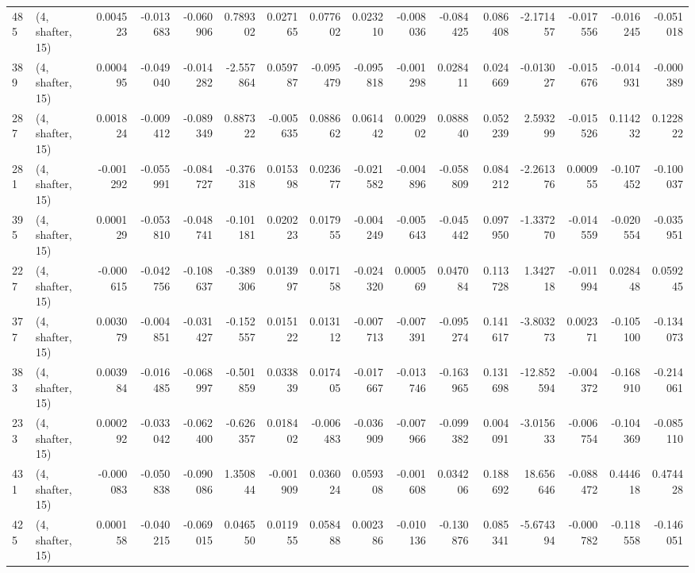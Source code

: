 \begin{tabular}{llrrrrrrrrrrrrrr}
485 &  (4, shafter, 15) &   0.004523 & -0.013683 & -0.060906 &    0.789302 &  0.027165 &   0.077602 &  0.023210 & -0.008036 & -0.084425 &  0.086408 &   -2.171457 & -0.017556 & -0.016245 & -0.051018 \\
389 &  (4, shafter, 15) &   0.000495 & -0.049040 & -0.014282 &   -2.557864 &  0.059787 &  -0.095479 & -0.095818 & -0.001298 &  0.028411 &  0.024669 &   -0.013027 & -0.015676 & -0.014931 & -0.000389 \\
287 &  (4, shafter, 15) &   0.001824 & -0.009412 & -0.089349 &    0.887322 & -0.005635 &   0.088662 &  0.061442 &  0.002902 &  0.088840 &  0.052239 &    2.593299 & -0.015526 &  0.114232 &  0.122822 \\
281 &  (4, shafter, 15) &  -0.001292 & -0.055991 & -0.084727 &   -0.376318 &  0.015398 &   0.023677 & -0.021582 & -0.004896 & -0.058809 &  0.084212 &   -2.261376 &  0.000955 & -0.107452 & -0.100037 \\
395 &  (4, shafter, 15) &   0.000129 & -0.053810 & -0.048741 &   -0.101181 &  0.020223 &   0.017955 & -0.004249 & -0.005643 & -0.045442 &  0.097950 &   -1.337270 & -0.014559 & -0.020554 & -0.035951 \\
227 &  (4, shafter, 15) &  -0.000615 & -0.042756 & -0.108637 &   -0.389306 &  0.013997 &   0.017158 & -0.024320 &  0.000569 &  0.047084 &  0.113728 &    1.342718 & -0.011994 &  0.028448 &  0.059245 \\
377 &  (4, shafter, 15) &   0.003079 & -0.004851 & -0.031427 &   -0.152557 &  0.015122 &   0.013112 & -0.007713 & -0.007391 & -0.095274 &  0.141617 &   -3.803273 &  0.002371 & -0.105100 & -0.134073 \\
383 &  (4, shafter, 15) &   0.003984 & -0.016485 & -0.068997 &   -0.501859 &  0.033839 &   0.017405 & -0.017667 & -0.013746 & -0.163965 &  0.131698 &  -12.852594 & -0.004372 & -0.168910 & -0.214061 \\
233 &  (4, shafter, 15) &   0.000292 & -0.033042 & -0.062400 &   -0.626357 &  0.018402 &  -0.006483 & -0.036909 & -0.007966 & -0.099382 &  0.004091 &   -3.015633 & -0.006754 & -0.104369 & -0.085110 \\
431 &  (4, shafter, 15) &  -0.000083 & -0.050838 & -0.090086 &    1.350844 & -0.001909 &   0.036024 &  0.059308 & -0.001608 &  0.034206 &  0.188692 &   18.656646 & -0.088472 &  0.444618 &  0.474428 \\
425 &  (4, shafter, 15) &   0.000158 & -0.040215 & -0.069015 &    0.046550 &  0.011955 &   0.058488 &  0.002386 & -0.010136 & -0.130876 &  0.085341 &   -5.674394 & -0.000782 & -0.118558 & -0.146051 \\

\end{tabular}
